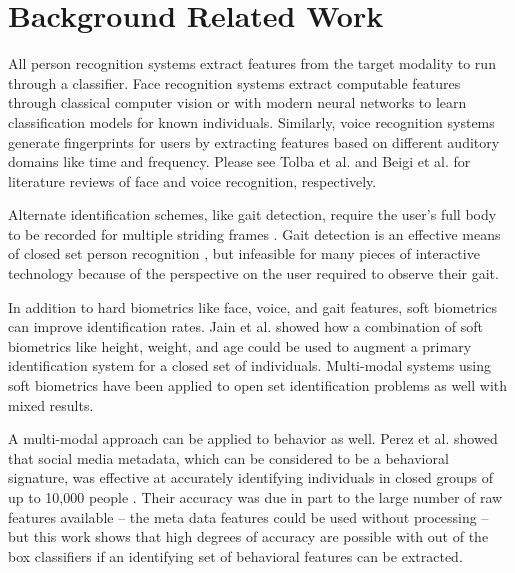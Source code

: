 \documentclass[conference]{IEEEtran}
\begin{document}
\section{Background Related Work}


All person recognition systems extract features from the target modality to run through a classifier. Face recognition systems extract computable features through classical computer vision \cite{turk1991face} or with modern neural networks \cite{parkhi2015deep} to learn classification models for known individuals. Similarly, voice recognition systems generate fingerprints for users by extracting features based on different auditory domains like time and frequency\cite{alonso2014speaker}. Please see Tolba et al. \cite{tolba2006face} and Beigi et al. \cite{beigi2011speaker} for literature reviews of face and voice recognition, respectively. 

Alternate identification schemes, like gait detection, require the user's full body to be recorded for multiple striding frames \cite{liang_wang_silhouette_2003}\cite{han_individual_2006}. Gait detection is an effective means of closed set person recognition \cite{tian2019free}, but infeasible for many pieces of interactive technology because of the perspective on the user required to observe their gait.

In addition to hard biometrics like face, voice, and gait features, soft biometrics can improve identification rates. Jain et al. \cite{jain2004soft} showed how a combination of soft biometrics like height, weight, and age could be used to augment a primary identification system for a closed set of individuals. Multi-modal systems using soft biometrics have been applied to open set identification problems as well with mixed results. \cite{irfan2018multi}\cite{martinson2013identifying}  

A multi-modal approach can be applied to behavior as well. Perez et al. showed that social media metadata, which can be considered to be a behavioral signature, was effective at accurately identifying individuals in closed groups of up to 10,000 people \cite{perez_you_2018}. Their accuracy was due in part to the large number of raw features available -- the meta data features could be used without processing -- but this work shows that high degrees of accuracy are possible with out of the box classifiers if an identifying set of behavioral features can be extracted. 
\end{document}
